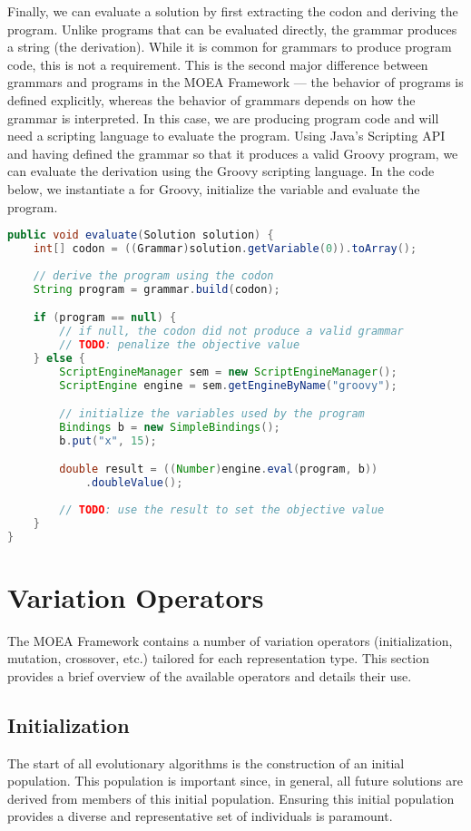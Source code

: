 Finally, we can evaluate a solution by first extracting the codon and deriving the program.  Unlike programs that can be evaluated directly, the grammar produces a string (the derivation).  While it is common for grammars to produce program code, this is not a requirement.  This is the second major difference between grammars and programs in the MOEA Framework --- the behavior of programs is defined explicitly, whereas the behavior of grammars depends on how the grammar is interpreted.  In this case, we are producing program code and will need a scripting language to evaluate the program.  Using Java's Scripting API and having defined the grammar so that it produces a valid Groovy program, we can evaluate the derivation using the Groovy scripting language.  In the code below, we instantiate a  for Groovy, initialize the variable  and evaluate the program.
\begin{lstlisting}[language=Java]
public void evaluate(Solution solution) {
    int[] codon = ((Grammar)solution.getVariable(0)).toArray();
    
    // derive the program using the codon
    String program = grammar.build(codon);

    if (program == null) {
        // if null, the codon did not produce a valid grammar
        // TODO: penalize the objective value
    } else {
        ScriptEngineManager sem = new ScriptEngineManager();
        ScriptEngine engine = sem.getEngineByName("groovy");

        // initialize the variables used by the program
        Bindings b = new SimpleBindings();
        b.put("x", 15);

        double result = ((Number)engine.eval(program, b))
            .doubleValue();
            
        // TODO: use the result to set the objective value
    }
}
\end{lstlisting}

\section{Variation Operators}
The MOEA Framework contains a number of variation operators (initialization, mutation, crossover, etc.) tailored for each representation type.  This section provides a brief overview of the available operators and details their use.

\subsection{Initialization}
The start of all evolutionary algorithms is the construction of an initial population.  This population is important since, in general, all future solutions are derived from members of this initial population.  Ensuring this initial population provides a diverse and representative set of individuals is paramount.

